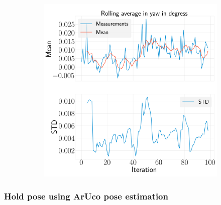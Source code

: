 \documentclass[../Head/report.tex]{subfiles}
\begin{document}
\begin{figure}[H]
\begin{subfigure}[t]{.30\textwidth}
        \caption{}
        \label{fig:rolling_average_in_pitch_test2}
    \end{subfigure}
     \hspace{0.2em}
    \begin{subfigure}[t]{.30\textwidth}
        \centering
        \includegraphics[width=\textwidth]{../Figures/analyse_rolling_average/test2/Calculated_rolling_average_in_yaw_with_mean_and_STD.png}
        \caption{}
        \label{fig:rolling_average_in_yaw_test2}
    \end{subfigure}
    \caption{}
    \label{fig:rolling_average_angle_test2}
\end{figure}


\subsubsection{Hold pose using ArUco pose estimation}
\end{document}
